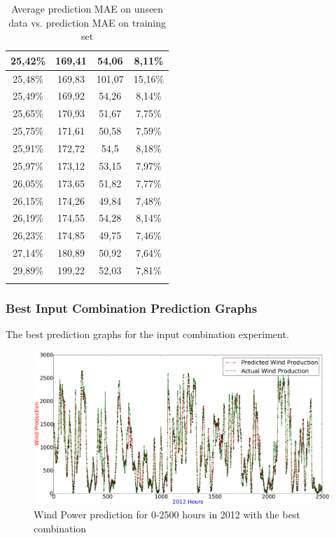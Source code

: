\begin{center}
\begin{longtable}{|c|c|c|c|}
25,42\% & 169,41 & 54,06 & 8,11\%  \\ \hline
25,48\% & 169,83 & 101,07 & 15,16\%  \\ \hline
25,49\% & 169,92 & 54,26 & 8,14\%  \\ \hline
25,65\% & 170,93 & 51,67 & 7,75\%  \\ \hline
25,75\% & 171,61 & 50,58 & 7,59\%  \\ \hline
25,91\% & 172,72 & 54,5 & 8,18\%  \\ \hline
25,97\% & 173,12 & 53,15 & 7,97\%  \\ \hline
26,05\% & 173,65 & 51,82 & 7,77\%  \\ \hline
26,15\% & 174,26 & 49,84 & 7,48\%  \\ \hline
26,19\% & 174,55 & 54,28 & 8,14\%  \\ \hline
26,23\% & 174,85 & 49,75 & 7,46\%  \\ \hline
27,14\% & 180,89 & 50,92 & 7,64\%  \\ \hline
29,89\% & 199,22 & 52,03 & 7,81\%  \\ \hline
\caption{Average prediction MAE on unseen data vs. prediction MAE on training set}
\label{table:predictionMAEUnseenVsTrainingSetAppendix}
\end{longtable}
\end{center}
\normalsize

\subsubsection{Best Input Combination Prediction Graphs}
\label{sec:bestCombiPredictionsGraphs}
The best prediction graphs for the input combination experiment.

\begin{figure}
\centering
\includegraphics[width=0.99\linewidth]{billeder/bestInputCombi0-2500.png}
\caption{Wind Power prediction for 0-2500 hours in 2012 with the best combination}
\label{fig:bestInputCombi0-2500}
\end{figure} 

